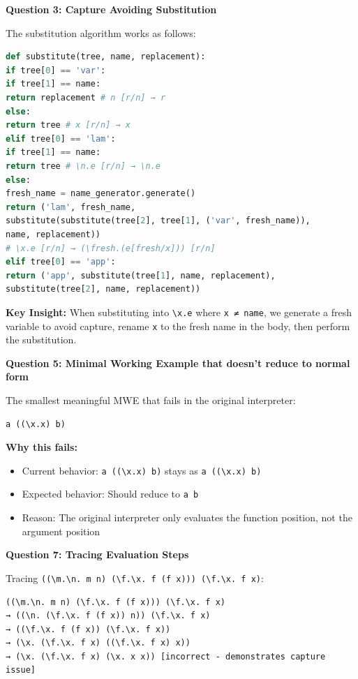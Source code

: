 \documentclass{article}
\theoremstyle{theorem}
\theoremstyle{definition}
\theoremstyle{remark}
\begin{document}
\textbf{Question 3: Capture Avoiding Substitution}

The substitution algorithm works as follows:

\begin{lstlisting}[language=Python]
def substitute(tree, name, replacement):
if tree[0] == 'var':
if tree[1] == name:
return replacement # n [r/n] → r
else:
return tree # x [r/n] → x
elif tree[0] == 'lam':
if tree[1] == name:
return tree # \n.e [r/n] → \n.e
else:
fresh_name = name_generator.generate()
return ('lam', fresh_name,
substitute(substitute(tree[2], tree[1], ('var', fresh_name)),
name, replacement))
# \x.e [r/n] → (\fresh.(e[fresh/x])) [r/n]
elif tree[0] == 'app':
return ('app', substitute(tree[1], name, replacement),
substitute(tree[2], name, replacement))
\end{lstlisting}

\textbf{Key Insight:} When substituting into \texttt{\textbackslash x.e} where \texttt{x ≠ name}, we generate a fresh variable to avoid capture, rename \texttt{x} to the fresh name in the body, then perform the substitution.

\textbf{Question 5: Minimal Working Example that doesn't reduce to normal form}

The smallest meaningful MWE that fails in the original interpreter:
\begin{lstlisting}
a ((\x.x) b)
\end{lstlisting}

\textbf{Why this fails:}
\begin{itemize}
\item Current behavior: \texttt{a ((\textbackslash x.x) b)} stays as \texttt{a ((\textbackslash x.x) b)}
\item Expected behavior: Should reduce to \texttt{a b}
\item Reason: The original interpreter only evaluates the function position, not the argument position
\end{itemize}

\textbf{Question 7: Tracing Evaluation Steps}

Tracing \texttt{((\textbackslash m.\textbackslash n. m n) (\textbackslash f.\textbackslash x. f (f x))) (\textbackslash f.\textbackslash x. f x)}:

\begin{verbatim}
((\m.\n. m n) (\f.\x. f (f x))) (\f.\x. f x)
→ ((\n. (\f.\x. f (f x)) n)) (\f.\x. f x)
→ ((\f.\x. f (f x)) (\f.\x. f x))
→ (\x. (\f.\x. f x) ((\f.\x. f x) x))
→ (\x. (\f.\x. f x) (\x. x x)) [incorrect - demonstrates capture issue]
\end{verbatim}
\end{document}
